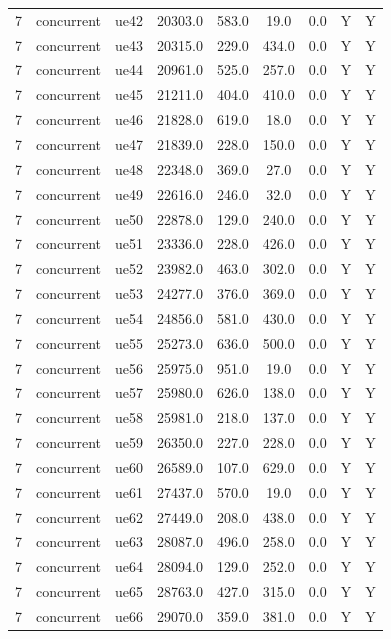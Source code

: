 \begin{table}[ht]
\begin{tabular}{|c|c|c|c|c|c|c|c|c|}
7 & concurrent & ue42 & 20303.0 & 583.0 & 19.0 & 0.0 & Y & Y \\
7 & concurrent & ue43 & 20315.0 & 229.0 & 434.0 & 0.0 & Y & Y \\
7 & concurrent & ue44 & 20961.0 & 525.0 & 257.0 & 0.0 & Y & Y \\
7 & concurrent & ue45 & 21211.0 & 404.0 & 410.0 & 0.0 & Y & Y \\
7 & concurrent & ue46 & 21828.0 & 619.0 & 18.0 & 0.0 & Y & Y \\
7 & concurrent & ue47 & 21839.0 & 228.0 & 150.0 & 0.0 & Y & Y \\
7 & concurrent & ue48 & 22348.0 & 369.0 & 27.0 & 0.0 & Y & Y \\
7 & concurrent & ue49 & 22616.0 & 246.0 & 32.0 & 0.0 & Y & Y \\
7 & concurrent & ue50 & 22878.0 & 129.0 & 240.0 & 0.0 & Y & Y \\
7 & concurrent & ue51 & 23336.0 & 228.0 & 426.0 & 0.0 & Y & Y \\
7 & concurrent & ue52 & 23982.0 & 463.0 & 302.0 & 0.0 & Y & Y \\
7 & concurrent & ue53 & 24277.0 & 376.0 & 369.0 & 0.0 & Y & Y \\
7 & concurrent & ue54 & 24856.0 & 581.0 & 430.0 & 0.0 & Y & Y \\
7 & concurrent & ue55 & 25273.0 & 636.0 & 500.0 & 0.0 & Y & Y \\
7 & concurrent & ue56 & 25975.0 & 951.0 & 19.0 & 0.0 & Y & Y \\
7 & concurrent & ue57 & 25980.0 & 626.0 & 138.0 & 0.0 & Y & Y \\
7 & concurrent & ue58 & 25981.0 & 218.0 & 137.0 & 0.0 & Y & Y \\
7 & concurrent & ue59 & 26350.0 & 227.0 & 228.0 & 0.0 & Y & Y \\
7 & concurrent & ue60 & 26589.0 & 107.0 & 629.0 & 0.0 & Y & Y \\
7 & concurrent & ue61 & 27437.0 & 570.0 & 19.0 & 0.0 & Y & Y \\
7 & concurrent & ue62 & 27449.0 & 208.0 & 438.0 & 0.0 & Y & Y \\
7 & concurrent & ue63 & 28087.0 & 496.0 & 258.0 & 0.0 & Y & Y \\
7 & concurrent & ue64 & 28094.0 & 129.0 & 252.0 & 0.0 & Y & Y \\
7 & concurrent & ue65 & 28763.0 & 427.0 & 315.0 & 0.0 & Y & Y \\
7 & concurrent & ue66 & 29070.0 & 359.0 & 381.0 & 0.0 & Y & Y \\

\end{tabular}
\end{table}
